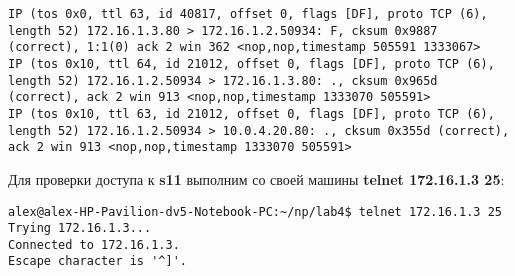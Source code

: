 \documentclass[a4paper,12pt]{article}
\begin{document}
\begin{Verbatim}
IP (tos 0x0, ttl 63, id 40817, offset 0, flags [DF], proto TCP (6), length 52) 172.16.1.3.80 > 172.16.1.2.50934: F, cksum 0x9887 (correct), 1:1(0) ack 2 win 362 <nop,nop,timestamp 505591 1333067>
IP (tos 0x10, ttl 64, id 21012, offset 0, flags [DF], proto TCP (6), length 52) 172.16.1.2.50934 > 172.16.1.3.80: ., cksum 0x965d (correct), ack 2 win 913 <nop,nop,timestamp 1333070 505591>
IP (tos 0x10, ttl 63, id 21012, offset 0, flags [DF], proto TCP (6), length 52) 172.16.1.2.50934 > 10.0.4.20.80: ., cksum 0x355d (correct), ack 2 win 913 <nop,nop,timestamp 1333070 505591>
\end{Verbatim}

Для проверки доступа к \textbf{s11} выполним со своей машины
\textbf{telnet 172.16.1.3 25}:
\begin{Verbatim}
alex@alex-HP-Pavilion-dv5-Notebook-PC:~/np/lab4$ telnet 172.16.1.3 25
Trying 172.16.1.3...
Connected to 172.16.1.3.
Escape character is '^]'.
\end{Verbatim}
\end{document}
